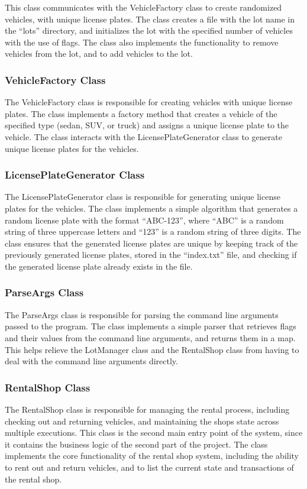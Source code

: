 \documentclass[conference]{IEEEtran}
\begin{document}
This class communicates with the VehicleFactory class to create randomized vehicles, with unique license plates. The class creates a file with the lot name in the ``lots'' directory, and initializes the lot with the specified number of vehicles with the use of flags. The class also implements the functionality to remove vehicles from the lot, and to add vehicles to the lot. 

\subsubsection{VehicleFactory Class}
The VehicleFactory class is responsible for creating vehicles with unique license plates. The class implements a factory method that creates a vehicle of the specified type (sedan, SUV, or truck) and assigns a unique license plate to the vehicle. The class interacts with the LicensePlateGenerator class to generate unique license plates for the vehicles. 

\subsubsection{LicensePlateGenerator Class}
The LicensePlateGenerator class is responsible for generating unique license plates for the vehicles. The class implements a simple algorithm that generates a random license plate with the format ``ABC-123'', where ``ABC'' is a random string of three uppercase letters and ``123'' is a random string of three digits. The class ensures that the generated license plates are unique by keeping track of the previously generated license plates, stored in the ``index.txt'' file, and checking if the generated license plate already exists in the file. 

\subsubsection{ParseArgs Class}
The ParseArgs class is responsible for parsing the command line arguments passed to the program. The class implements a simple parser that retrieves flags and their values from the command line arguments, and returns them in a map. This helps relieve the LotManager class and the RentalShop class from having to deal with the command line arguments directly. 

\subsubsection{RentalShop Class}
The RentalShop class is responsible for managing the rental process, including checking out and returning vehicles, and maintaining the shops state across multiple executions. This class is the second main entry point of the system, since it contains the business logic of the second part of the project. The class implements the core functionality of the rental shop system, including the ability to rent out and return vehicles, and to list the current state and transactions of the rental shop. 
\end{document}
